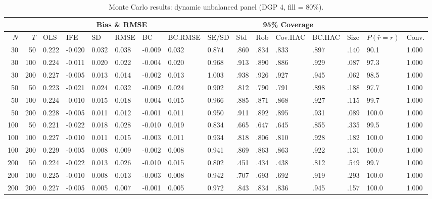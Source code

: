 \begin{table}[ht]
\centering
\caption{Monte Carlo results: dynamic unbalanced panel (DGP 4, fill = 80\%).} 
\label{tab:mc_dyn_unb_f80}
\begin{tabular}{rrllllllllllllll}
  \hline
 & & \multicolumn{6}{c}{Bias \& RMSE} & & \multicolumn{4}{c}{95\% Coverage} & & & \\
\cline{3-8}\cline{10-13}
 \hline
$N$ & $T$ & OLS & IFE & SD & RMSE & BC & BC.RMSE & SE/SD & Std & Rob & Cov.HAC & BC.HAC & Size & $P(\hat r=r)$ & Conv. \\ 
  \hline
30 & 50 & 0.222 & -0.020 & 0.032 & 0.038 & -0.009 & 0.032 & 0.874 & .860 & .834 & .833 & .897 & .140 & 90.1 & 1.000 \\ 
  30 & 100 & 0.224 & -0.011 & 0.020 & 0.022 & -0.004 & 0.020 & 0.968 & .913 & .890 & .886 & .929 & .087 & 97.3 & 1.000 \\ 
  30 & 200 & 0.227 & -0.005 & 0.013 & 0.014 & -0.002 & 0.013 & 1.003 & .938 & .926 & .927 & .945 & .062 & 98.5 & 1.000 \\ 
  50 & 50 & 0.223 & -0.021 & 0.024 & 0.032 & -0.009 & 0.024 & 0.902 & .812 & .790 & .791 & .898 & .188 & 97.7 & 1.000 \\ 
  50 & 100 & 0.224 & -0.010 & 0.015 & 0.018 & -0.004 & 0.015 & 0.966 & .885 & .871 & .868 & .927 & .115 & 99.7 & 1.000 \\ 
  50 & 200 & 0.228 & -0.005 & 0.011 & 0.012 & -0.001 & 0.011 & 0.950 & .911 & .892 & .895 & .931 & .089 & 100.0 & 1.000 \\ 
  100 & 50 & 0.221 & -0.022 & 0.018 & 0.028 & -0.010 & 0.019 & 0.834 & .665 & .647 & .645 & .855 & .335 & 99.5 & 1.000 \\ 
  100 & 100 & 0.227 & -0.010 & 0.011 & 0.015 & -0.003 & 0.011 & 0.934 & .818 & .806 & .810 & .928 & .182 & 100.0 & 1.000 \\ 
  100 & 200 & 0.229 & -0.005 & 0.008 & 0.009 & -0.002 & 0.008 & 0.941 & .869 & .863 & .863 & .922 & .131 & 100.0 & 1.000 \\ 
  200 & 50 & 0.224 & -0.022 & 0.013 & 0.026 & -0.010 & 0.015 & 0.802 & .451 & .434 & .438 & .812 & .549 & 99.7 & 1.000 \\ 
  200 & 100 & 0.225 & -0.010 & 0.008 & 0.013 & -0.003 & 0.008 & 0.942 & .707 & .693 & .692 & .919 & .293 & 100.0 & 1.000 \\ 
  200 & 200 & 0.227 & -0.005 & 0.005 & 0.007 & -0.001 & 0.005 & 0.972 & .843 & .834 & .836 & .945 & .157 & 100.0 & 1.000 \\ 
   \hline
\end{tabular}
\end{table}
